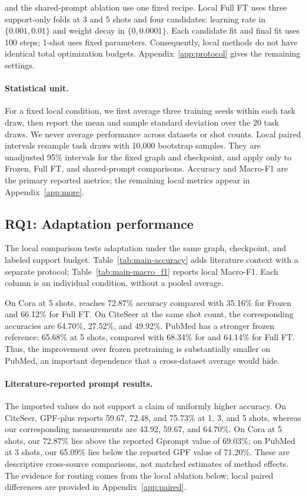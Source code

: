 \method{} and the shared-prompt ablation use one fixed recipe. Local Full FT uses three support-only folds at 3 and 5 shots and four candidates: learning rate in $\{0.001,0.01\}$ and weight decay in $\{0,0.0001\}$. Each candidate fit and final fit uses 100 steps; 1-shot uses fixed parameters. Consequently, local methods do not have identical total optimization budgets. Appendix~\ref{app:protocol} gives the remaining settings.

\paragraph{Statistical unit.}
For a fixed local condition, we first average three training seeds within each task draw, then report the mean and sample standard deviation over the 20 task draws. We never average performance across datasets or shot counts. Local paired intervals resample task draws with 10,000 bootstrap samples. They are unadjusted 95\% intervals for the fixed graph and checkpoint, and apply only to Frozen, Full FT, and shared-prompt comparisons. Accuracy and Macro-F1 are the primary reported metrics; the remaining local metrics appear in Appendix~\ref{app:more}.

\subsection{RQ1: Adaptation performance}
The local comparison tests adaptation under the same graph, checkpoint, and labeled support budget. Table~\ref{tab:main-accuracy} adds literature context with a separate protocol; Table~\ref{tab:main-macro_f1} reports local Macro-F1. Each column is an individual condition, without a pooled average.

On Cora at 5 shots, \method{} reaches 72.87\% accuracy compared with 35.16\% for Frozen and 66.12\% for Full FT. On CiteSeer at the same shot count, the corresponding accuracies are 64.70\%, 27.52\%, and 49.92\%. PubMed has a stronger frozen reference: 65.68\% at 5 shots, compared with 68.34\% for \method{} and 64.14\% for Full FT. Thus, the improvement over frozen pretraining is substantially smaller on PubMed, an important dependence that a cross-dataset average would hide.

\paragraph{Literature-reported prompt results.}
The imported values do not support a claim of uniformly higher accuracy. On CiteSeer, GPF-plus reports 59.67, 72.48, and 75.73\% at 1, 3, and 5 shots, whereas our corresponding measurements are 43.92, 59.67, and 64.70\%. On Cora at 5 shots, our 72.87\% lies above the reported Gprompt value of 69.03\%; on PubMed at 3 shots, our 65.09\% lies below the reported GPF value of 71.20\%. These are descriptive cross-source comparisons, not matched estimates of method effects. The evidence for routing comes from the local ablation below; local paired differences are provided in Appendix~\ref{app:paired}.

